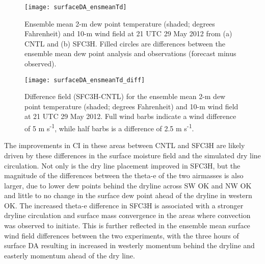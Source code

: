 \begin{figure}
\centering
\texttt{[image: surfaceDA\_ensmeanTd]}
\caption{Ensemble mean 2-m dew point temperature (shaded; degrees Fahrenheit) and 10-m wind field at 21 UTC 29 May 2012 from (a) CNTL and (b) SFC3H. Filled circles are differences between the ensemble mean dew point analysis and observations (forecast minus observed). }
\label{sfcmeantd}
\end{figure}
\begin{figure}
\centering
\texttt{[image: surfaceDA\_ensmeanTd\_diff]}
\caption{Difference field (SFC3H-CNTL) for the ensemble mean 2-m dew point temperature (shaded; degrees Fahrenheit) and 10-m wind field at 21 UTC 29 May 2012. Full wind barbs indicate a wind difference of 5 m s\textsuperscript{-1}, while half barbs is a difference of 2.5 m s\textsuperscript{-1}. }
\label{sfcmeantddiff}
\end{figure}

The improvements in CI in these areas between CNTL and SFC3H are likely driven by these differences in the surface moisture field and the simulated dry line circulation. Not only is the dry line placement improved in SFC3H, but the magnitude of the differences between the theta-e of the two airmasses is also larger, due to lower dew points behind the dryline across SW OK and NW OK and little to no change in the surface dew point ahead of the dryline in western OK. The increased theta-e difference in SFC3H is associated with a stronger dryline circulation and surface mass convergence in the areas where convection was observed to initiate. This is further reflected in the ensemble mean surface wind field differences between the two experiments, with the three hours of surface DA resulting in increased in westerly momentum behind the dryline and easterly momentum ahead of the dry line.

